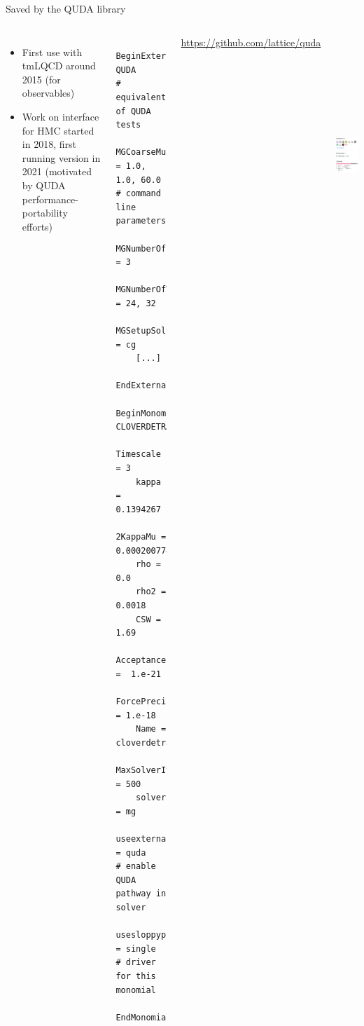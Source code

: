 \documentclass[xcolor={dvipsnames,table}]{beamer}
\begin{document}
\begin{frame}[fragile]{Saved by the QUDA library}
  \begin{columns}
      \begin{itemize}
        \item First use with tmLQCD around 2015 (for observables)
        \vspace{0.20cm}
        \item Work on interface for HMC started in 2018, first running version in 2021 (motivated by QUDA performance-portability efforts)
      \end{itemize}
      \vspace{-0.3cm}
      \footnotesize
      \begin{verbatim}
  BeginExternalInverter QUDA           # equivalents of QUDA tests
    MGCoarseMuFactor = 1.0, 1.0, 60.0  # command line parameters
    MGNumberOfLevels = 3
    MGNumberOfVectors = 24, 32
    MGSetupSolver = cg
    [...]
  EndExternalInverter
  BeginMonomial CLOVERDETRATIO
    Timescale = 3
    kappa = 0.1394267
    2KappaMu = 0.000200774448
    rho = 0.0
    rho2 = 0.0018
    CSW = 1.69
    AcceptancePrecision =  1.e-21
    ForcePrecision = 1.e-18
    Name = cloverdetratio3light
    MaxSolverIterations = 500
    solver = mg
    useexternalinverter = quda         # enable QUDA pathway in solver
    usesloppyprecision = single        # driver for this monomial
  EndMonomial
      \end{verbatim}
      \centering
      \begin{hpcablock}{}
        \centering
        \textcolor{blue}{\href{https://github.com/lattice/quda}{https://github.com/lattice/quda}}
      \end{hpcablock}
      \includegraphics[height=90mm]{quda_contributors.png}
  \end{columns}
\end{frame}
\end{document}
